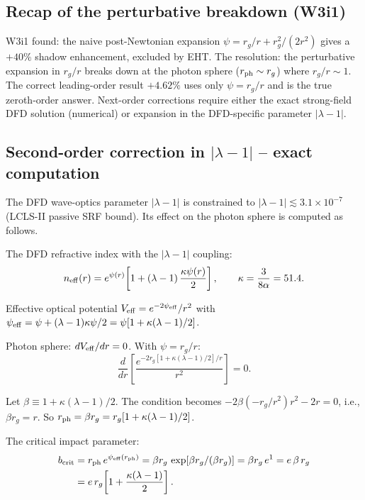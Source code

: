 \documentclass[11pt]{article}
\newcommand{\ee}[1]{\times 10^{#1}}
\newcommand{\alphafine}{\alpha}
\newcommand{\lambdaone}{|\lambda-1|}
\begin{document}
\subsection{Recap of the perturbative breakdown (W3i1)}

W3i1 found: the naive post-Newtonian expansion $\psi = r_g/r + r_g^2/(2r^2)$
gives a $+40\%$ shadow enhancement, excluded by EHT.  The resolution:
the perturbative expansion in $r_g/r$ breaks down at the photon sphere
($r_{\rm ph} \sim r_g$) where $r_g/r \sim 1$.  The correct leading-order
result $+4.62\%$ uses only $\psi = r_g/r$ and is the true zeroth-order
answer.  Next-order corrections require either the exact strong-field DFD
solution (numerical) or expansion in the DFD-specific parameter $\lambdaone$.

\subsection{Second-order correction in $\lambdaone$ -- exact computation}

The DFD wave-optics parameter $\lambdaone$ is constrained to
$\lambdaone \lesssim 3.1\ee{-7}$ (LCLS-II passive SRF bound).  Its
effect on the photon sphere is computed as follows.

The DFD refractive index with the $\lambdaone$ coupling:
\begin{equation}
  n_{\rm eff}(r) = e^{\psi(r)}\!\left[1 + (\lambda-1)\,
  \frac{\kappa\psi(r)}{2}\right], \qquad \kappa = \frac{3}{8\alphafine} = 51.4.
\end{equation}

Effective optical potential $V_{\rm eff} = e^{-2\psi_{\rm eff}}/r^2$
with $\psi_{\rm eff} = \psi + (\lambda-1)\kappa\psi/2 = \psi[1 + \kappa(\lambda-1)/2]$.

Photon sphere: $dV_{\rm eff}/dr = 0$.  With $\psi = r_g/r$:
\begin{equation}
  \frac{d}{dr}\left[\frac{e^{-2r_g[1+\kappa(\lambda-1)/2]/r}}{r^2}\right] = 0.
\end{equation}

Let $\beta \equiv 1 + \kappa(\lambda-1)/2$.  The condition becomes
$-2\beta(-r_g/r^2)r^2 - 2r = 0$, i.e., $\beta r_g = r$.
So $r_{\rm ph} = \beta r_g = r_g[1 + \kappa(\lambda-1)/2]$.

The critical impact parameter:
\begin{align}
  b_{\rm crit} &= r_{\rm ph}\,e^{\psi_{\rm eff}(r_{\rm ph})}
  = \beta r_g\,\exp\!\left[\beta r_g/(\beta r_g)\right]
  = \beta r_g\,e^1 = e\,\beta\,r_g \nonumber\\
  &= e\,r_g\!\left[1 + \frac{\kappa(\lambda-1)}{2}\right].
\end{align}
\end{document}
